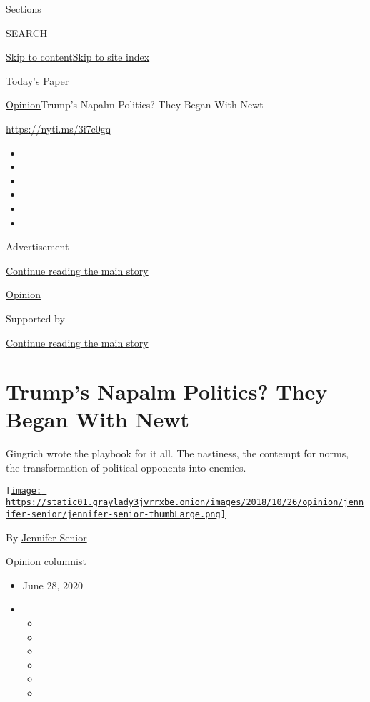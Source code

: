 Sections

SEARCH

\protect\hyperlink{site-content}{Skip to
content}\protect\hyperlink{site-index}{Skip to site index}

\href{https://myaccount.nytimes3xbfgragh.onion/auth/login?response_type=cookie\&client_id=vi}{}

\href{https://www.nytimes3xbfgragh.onion/section/todayspaper}{Today's
Paper}

\href{/section/opinion}{Opinion}\textbar{}Trump's Napalm Politics? They
Began With Newt

\url{https://nyti.ms/3i7c0gq}

\begin{itemize}
\item
\item
\item
\item
\item
\item
\end{itemize}

Advertisement

\protect\hyperlink{after-top}{Continue reading the main story}

\href{/section/opinion}{Opinion}

Supported by

\protect\hyperlink{after-sponsor}{Continue reading the main story}

\hypertarget{trumps-napalm-politics-they-began-with-newt}{%
\section{Trump's Napalm Politics? They Began With
Newt}\label{trumps-napalm-politics-they-began-with-newt}}

Gingrich wrote the playbook for it all. The nastiness, the contempt for
norms, the transformation of political opponents into enemies.

\href{https://www.nytimes3xbfgragh.onion/by/jennifer-senior}{\texttt{[image: https://static01.graylady3jvrrxbe.onion/images/2018/10/26/opinion/jennifer-senior/jennifer-senior-thumbLarge.png]}}

By \href{https://www.nytimes3xbfgragh.onion/by/jennifer-senior}{Jennifer
Senior}

Opinion columnist

\begin{itemize}
\item
  June 28, 2020
\item
  \begin{itemize}
  \item
  \item
  \item
  \item
  \item
  \item
  \end{itemize}
\end{itemize}

